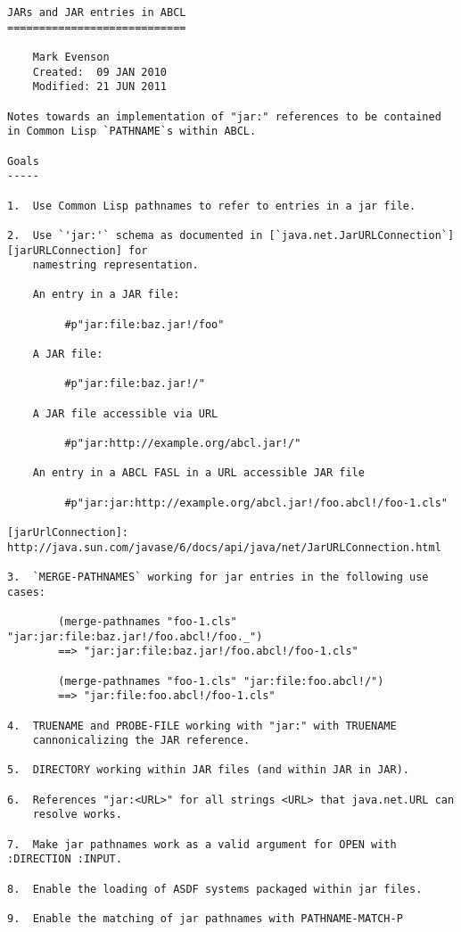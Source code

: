 \begin{verbatim}
JARs and JAR entries in ABCL
============================

    Mark Evenson
    Created:  09 JAN 2010
    Modified: 21 JUN 2011

Notes towards an implementation of "jar:" references to be contained
in Common Lisp `PATHNAME`s within ABCL.

Goals
-----

1.  Use Common Lisp pathnames to refer to entries in a jar file.
    
2.  Use `'jar:'` schema as documented in [`java.net.JarURLConnection`][jarURLConnection] for
    namestring representation.

    An entry in a JAR file:

         #p"jar:file:baz.jar!/foo"
    
    A JAR file:

         #p"jar:file:baz.jar!/"

    A JAR file accessible via URL

         #p"jar:http://example.org/abcl.jar!/"

    An entry in a ABCL FASL in a URL accessible JAR file

         #p"jar:jar:http://example.org/abcl.jar!/foo.abcl!/foo-1.cls"
         
[jarUrlConnection]: http://java.sun.com/javase/6/docs/api/java/net/JarURLConnection.html

3.  `MERGE-PATHNAMES` working for jar entries in the following use cases:

        (merge-pathnames "foo-1.cls" "jar:jar:file:baz.jar!/foo.abcl!/foo._")
        ==> "jar:jar:file:baz.jar!/foo.abcl!/foo-1.cls"

        (merge-pathnames "foo-1.cls" "jar:file:foo.abcl!/")
        ==> "jar:file:foo.abcl!/foo-1.cls"

4.  TRUENAME and PROBE-FILE working with "jar:" with TRUENAME
    cannonicalizing the JAR reference.

5.  DIRECTORY working within JAR files (and within JAR in JAR).

6.  References "jar:<URL>" for all strings <URL> that java.net.URL can
    resolve works.

7.  Make jar pathnames work as a valid argument for OPEN with
:DIRECTION :INPUT.

8.  Enable the loading of ASDF systems packaged within jar files.

9.  Enable the matching of jar pathnames with PATHNAME-MATCH-P


\end{verbatim}
